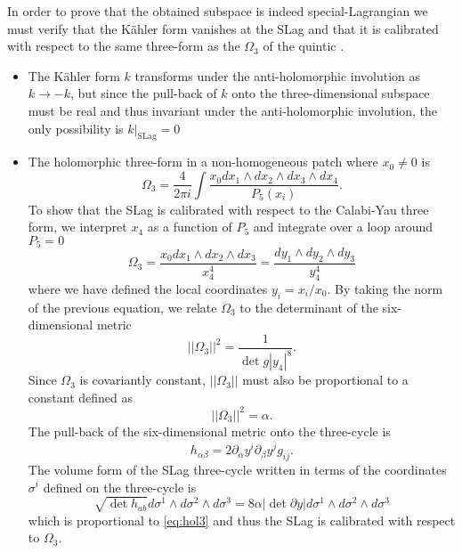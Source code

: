 In order to prove that the obtained subspace is indeed special-Lagrangian we must
verify that the Kähler form vanishes at the SLag and that it is calibrated with respect to the
same three-form as the $\Omega_3$ of the quintic \cite{Becker1995}.
\begin{itemize}
  \item The Kähler form $k$ transforms under the anti-holomorphic involution as $k\to -k$, 
    but since the pull-back of $k$ onto the three-dimensional subspace must be real and thus invariant under the anti-holomorphic involution, 
    the only possibility is $k\rvert_{\mathrm{SLag}}=0$

  \item 
The holomorphic three-form in a non-homogeneous patch where $x_0\neq0$ is
\begin{equation}
  \Omega_3=\frac{4}{2\pi i}\int \frac{x_0 dx_1\wedge dx_2 \wedge dx_3 \wedge dx_4}{P_5(x_i)}.
  \label{eq:3form}
\end{equation}
To show that the SLag is calibrated with respect to the Calabi-Yau three form,
we interpret $x_4$ as a function of $P_5$ and integrate over a loop around $P_5=0$
\begin{equation}
  \Omega_3=\frac{x_0 dx_1\wedge dx_2 \wedge dx_3}{x_4^4}
  =\frac{dy_1\wedge dy_2\wedge dy_3}{y_4^4}
  \label{eq:hol3}
\end{equation}
where we have defined the local coordinates $y_i=x_i/x_0$.
By taking the norm of the previous equation, we relate $\Omega_3$ to the determinant of the 
six-dimensional metric
\begin{equation}
  ||\Omega_3||^2 = \frac{1}{\det g |y_4|^8}.
\end{equation}
Since $\Omega_3$ is covariantly constant, $||\Omega_3||$ must also be proportional to a constant defined as
\begin{equation}
  ||\Omega_3||^2 = \alpha. %
\end{equation}
The pull-back of the six-dimensional metric onto the three-cycle is
\begin{equation}
  h_{\alpha\beta}=2\partial_\alpha y^i \partial_\beta y^{\bar j}g_{i\bar j}.
\end{equation}
The volume form of the SLag three-cycle written in terms of the coordinates $\sigma^i$
defined on the three-cycle is
\begin{equation}
   \sqrt{\det h_{ab}}d\sigma^1\wedge d\sigma^2\wedge d\sigma^3
  = 8\alpha|\det \partial y|d\sigma^1\wedge d\sigma^2\wedge d\sigma^3
\end{equation}
which is proportional to \eqref{eq:hol3} and thus the SLag is calibrated with respect to $\Omega_3$.
\end{itemize}

